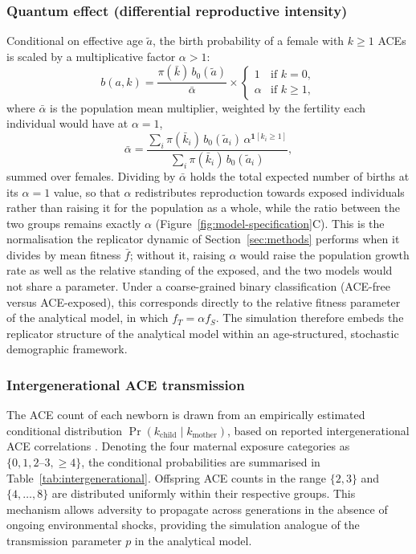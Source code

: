 \documentclass{article}
\begin{document}
\subsubsection*{Quantum effect (differential reproductive intensity)}
Conditional on effective age \(\tilde{a}\), the birth probability of a female
with \(k \geq 1\) ACEs is scaled by a multiplicative factor \(\alpha > 1\):
\[
    b(a, k) =
    \frac{\pi(\bar{k})\, b_0(\tilde{a})}{\bar{\alpha}}
    \times
    \begin{cases}
        1      & \text{if } k = 0, \\
        \alpha & \text{if } k \geq 1,
    \end{cases}
\]
where \(\bar{\alpha}\) is the population mean multiplier, weighted by the
fertility each individual would have at \(\alpha = 1\),
\[
    \bar{\alpha}
    = \frac{\sum_i \pi(\bar{k}_i)\, b_0(\tilde{a}_i)\,
            \alpha^{\mathbf{1}[k_i \geq 1]}}
           {\sum_i \pi(\bar{k}_i)\, b_0(\tilde{a}_i)},
\]
summed over females.  Dividing by \(\bar{\alpha}\) holds the total expected
number of births at its \(\alpha = 1\) value, so that \(\alpha\) redistributes
reproduction towards exposed individuals rather than raising it for the
population as a whole, while the ratio between the two groups remains exactly
\(\alpha\) (Figure~\ref{fig:model-specification}C).  This is the normalisation
the replicator dynamic of Section~\ref{sec:methods} performs when it divides by
mean fitness \(\bar f\); without it, raising \(\alpha\) would raise the
population growth rate as well as the relative standing of the exposed, and the
two models would not share a parameter.
Under a coarse-grained binary classification (ACE-free versus ACE-exposed),
this corresponds directly to the relative fitness parameter of the analytical
model, in which \(f_T = \alpha f_S\).  The simulation therefore embeds the
replicator structure of the analytical model within an age-structured,
stochastic demographic framework.

\subsubsection*{Intergenerational ACE transmission}
The ACE count of each newborn is drawn from an empirically estimated
conditional distribution \(\Pr(k_{\text{child}} \mid k_{\text{mother}})\), based
on reported intergenerational ACE correlations
\cite{schickedanz2021intergenerational}.
Denoting the four maternal exposure categories as \(\{0, 1, 2\text{--}3,
\geq 4\}\), the conditional probabilities are summarised in
Table~\ref{tab:intergenerational}.  Offspring ACE counts in the range
\(\{2, 3\}\) and \(\{4, \dots, 8\}\) are distributed uniformly within their
respective groups.  This mechanism allows adversity to propagate across
generations in the absence of ongoing environmental shocks, providing the
simulation analogue of the transmission parameter \(p\) in the analytical model.
\end{document}
